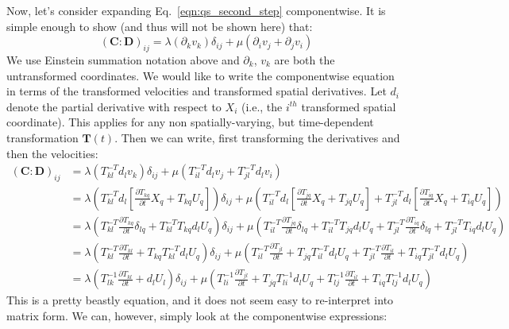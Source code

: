 \documentclass[11pt]{article}
\newcommand{\p}{\partial}
\newcommand{\bC}{\mathbf{C}}
\newcommand{\bD}{\mathbf{D}}
\newcommand{\bT}{\mathbf{T}}
\begin{document}
Now, let's consider expanding Eq.~\ref{eqn:qs_second_step} componentwise. It is simple enough to show (and thus will not be shown here) that:
\begin{equation*}
    (\bC : \bD)_{ij} = \lambda \left(\p_k v_k\right)\delta_{ij} + \mu\left(\p_i v_j + \p_j v_i\right) \end{equation*}
    We use Einstein summation notation above and $\p_k$, $v_k$ are both the untransformed coordinates. We would like to write the componentwise equation in terms of the transformed velocities and transformed spatial derivatives. Let $d_i$ denote the partial derivative with respect to $X_i$ (i.e., the $i^{th}$ transformed spatial coordinate). This applies for any non spatially-varying, but time-dependent transformation $\bT(t)$. Then we can write, first transforming the derivatives and then the velocities:
\begin{align}
    \left(\bC : \bD\right)_{ij} &= \lambda \left(T^{-T}_{kl}d_lv_k\right)\delta_{ij} + \mu\left(T^{-T}_{il}d_lv_j + T^{-T}_{jl}d_lv_i\right)\nonumber\\
    &= \lambda \left( T^{-T}_{kl}d_l \left[\frac{\p T_{kq}}{\p t}X_q + T_{kq} U_q\right]\right)\delta_{ij}+ \mu \left(T^{-T}_{il}d_l\left[\frac{\p T_{jq}}{\p t}X_q + T_{jq}U_q\right] + T^{-T}_{jl}d_l\left[\frac{\p T_{iq}}{\p t}X_q + T_{iq}U_q\right]\right)\nonumber\\
    &= \lambda \left(T^{-T}_{kl}\frac{\p T_{kq}}{\p t}\delta_{lq} + T^{-T}_{kl}T_{kq}d_lU_q \right)\delta_{ij} + \mu \left(T^{-T}_{il}\frac{\p T_{jq}}{\p t}\delta_{lq} + T^{-T}_{il}T_{jq}d_lU_q + T^{-T}_{jl}\frac{\p T_{iq}}{\p t}\delta_{lq} + T^{-T}_{jl}T_{iq}d_lU_q\right)\nonumber\\
    &= \lambda \left(T^{-T}_{kl} \frac{\p T_{kl}}{\p t} + T_{kq}T^{-T}_{kl}d_lU_q\right)\delta_{ij} + \mu \left(T^{-T}_{il}\frac{\p T_{jl}}{\p t} + T_{jq}T^{-T}_{il}d_lU_q + T^{-T}_{jl}\frac{\p T_{il}}{\p t} + T_{iq}T^{-T}_{jl}d_lU_q \right) \nonumber\\
    &= \lambda \left(T^{-1}_{lk} \frac{\p T_{kl}}{\p t} + d_lU_l\right)\delta_{ij} + \mu \left(T^{-1}_{li}\frac{\p T_{jl}}{\p t} + T_{jq}T^{-1}_{li}d_lU_q + T^{-1}_{lj}\frac{\p T_{il}}{\p t} + T_{iq}T^{-1}_{lj}d_lU_q \right)
    \label{eqn:c_contr_d}
\end{align}
This is a pretty beastly equation, and it does not seem easy to re-interpret into matrix form. We can, however, simply look at the componentwise expressions:
\end{document}
